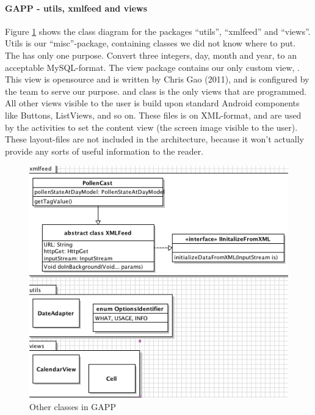 \paragraph{GAPP - utils, xmlfeed and views}
Figure \ref{fig:class-diagram-parent-extras} shows the class diagram for the packages ``utils'', ``xmlfeed'' and ``views''.
Utils is our ``misc''-package, containing classes we did not know where to put. The  has only one purpose. Convert three integers, 
day, month and year, to an acceptable MySQL-format. The view package contains our only custom view, . This view is opensource and is 
written by Chris Gao (2011)\cite{calendarview}, and is configured by the team to serve our purpose.
 and  class is the only views that are programmed. All other views visible to the user is build upon standard Android components like Buttons, ListViews, and so on. 
These files is on XML-format, and are used by the activities to set the content view (the screen image visible to the user). 
These layout-files are not included in the architecture, because it won't actually provide any sorts of useful information to the reader.  

\begin{figure}
	\centering
		\includegraphics[width = \linewidth]{Pictures/ArchPictures/divclass.png}
	\caption{Other classes in GAPP}
	\label{fig:class-diagram-parent-extras}
\end{figure}

